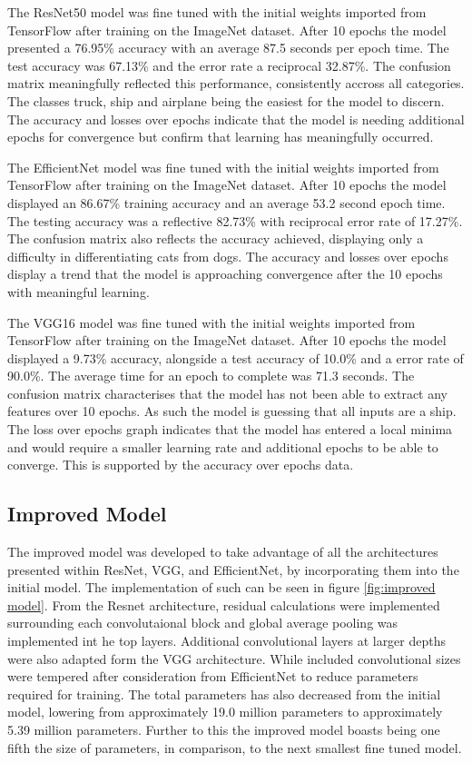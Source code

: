 \documentclass[10pt,twocolumn,letterpaper]{article}
\begin{document}
The ResNet50 model was fine tuned with the initial weights imported from TensorFlow after training on the ImageNet dataset. After 10 epochs the model presented a 76.95\% accuracy with an average 87.5 seconds per epoch time. The test accuracy was 67.13\% and the error rate a reciprocal 32.87\%. The confusion matrix meaningfully reflected this performance, consistently accross all categories. The classes truck, ship and airplane being the easiest for the model to discern. The accuracy and losses over epochs indicate that the model is needing additional epochs for convergence but confirm that learning has meaningfully occurred. 

The EfficientNet model was fine tuned  with the initial weights imported from TensorFlow after training on the ImageNet dataset. After 10 epochs the model displayed an 86.67\% training accuracy and an average 53.2 second epoch time. The testing accuracy was a reflective 82.73\% with reciprocal error rate of 17.27\%. The confusion matrix also reflects the accuracy achieved, displaying only a difficulty in differentiating cats from dogs. The accuracy and losses over epochs display a trend that the model is approaching convergence after the 10 epochs with meaningful learning. 

The VGG16 model was fine tuned with the initial weights imported from TensorFlow after training on the ImageNet dataset. After 10 epochs the model displayed a 9.73\% accuracy, alongside a test accuracy of 10.0\% and a error rate of 90.0\%. The average time for an epoch to complete was 71.3 seconds. The confusion matrix characterises that the model has not been able to extract any features over 10 epochs. As such the model is guessing that all inputs are a ship. The loss over epochs graph indicates that the model has entered a local minima and would require a smaller learning rate and additional epochs to be able to converge. This is supported by the accuracy over epochs data. 

\subsection{Improved Model}
The improved model was developed to take advantage of all the architectures presented within ResNet, VGG, and EfficientNet, by incorporating them into the initial model. The implementation of such can be seen in figure \ref{fig:improved model}. From the Resnet architecture, residual calculations were implemented surrounding each convolutaional block and global average pooling was implemented int he top layers. Additional convolutional layers at larger depths were also adapted form the VGG architecture. While included convolutional sizes were tempered after consideration from EfficientNet to reduce parameters required for training. The total parameters has also decreased from the initial model, lowering from approximately 19.0 million parameters to approximately 5.39 million parameters. Further to this the improved model boasts being one fifth the size of parameters, in comparison, to the next smallest fine tuned model. 
\end{document}
